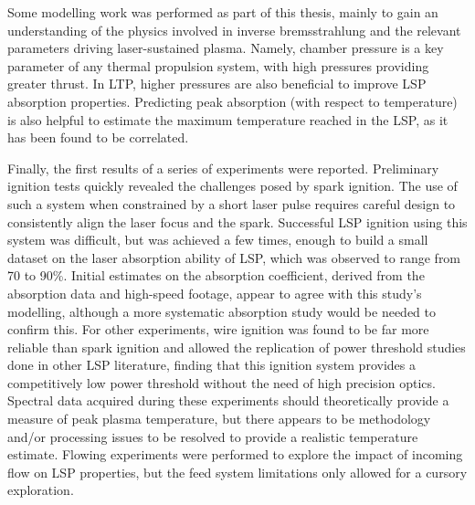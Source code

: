     Some modelling work was performed as part of this thesis, mainly to gain an understanding of the physics involved in inverse bremsstrahlung and the relevant parameters driving laser-sustained plasma. Namely, chamber pressure is a key parameter of any thermal propulsion system, with high pressures providing greater thrust. In LTP, higher pressures are also beneficial to improve LSP absorption properties. Predicting peak absorption (with respect to temperature) is also helpful to estimate the maximum temperature reached in the LSP, as it has been found to be correlated. 

    Finally, the first results of a series of experiments were reported. Preliminary ignition tests quickly revealed the challenges posed by spark ignition. The use of such a system when constrained by a short laser pulse requires careful design to consistently align the laser focus and the spark. Successful LSP ignition using this system was difficult, but was achieved a few times, enough to build a small dataset on the laser absorption ability of LSP, which was observed to range from 70 to 90\%. Initial estimates on the absorption coefficient, derived from the absorption data and high-speed footage, appear to agree with this study's modelling, although a more systematic absorption study would be needed to confirm this. For other experiments, wire ignition was found to be far more reliable than spark ignition and allowed the replication of power threshold studies done in other LSP literature, finding that this ignition system provides a competitively low power threshold without the need of high precision optics. Spectral data acquired during these experiments should theoretically provide a measure of peak plasma temperature, but there appears to be methodology and/or processing issues to be resolved to provide a realistic temperature estimate. Flowing experiments were performed to explore the impact of incoming flow on LSP properties, but the feed system limitations only allowed for a cursory exploration.
    
